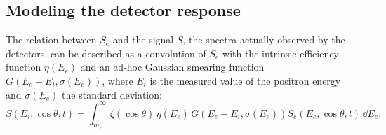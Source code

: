 \documentclass[a4paper,11pt]{article}
\begin{document}

\subsection{Modeling the detector response}
\label{sect:Modeling}

The %
relation between $S_e$ and the  signal 
$S$, the spectra actually observed by the  detectors, 
 can be described as  a convolution of $S_e$ with the intrinsic efficiency function $\eta(E_e)$ and an ad-hoc Gaussian smearing function $G(E_e-E_i, \sigma(E_e))$, where $E_i$ is the measured value of the positron energy and $\sigma(E_e)$ the %
 standard deviation:
\begin{equation}
 \label{eq:differential_observed_signal}
    S(E_i, \cos{\theta}, t)=\int_{m_e}^{\infty}\zeta(\cos{\theta})\,\eta(E_e)\,G(E_e-E_i,\sigma(E_e))S_e(E_e,\cos{\theta},t)\,\dd E_e.
 \end{equation}
\end{document}

